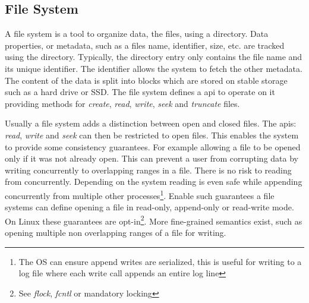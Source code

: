 \subsection{File System}
A file system is a tool to organize data, the files, using a directory. Data properties, or metadata, such as a files name, identifier, size, etc. are tracked using the directory. Typically, the directory entry only contains the file name and its unique identifier. The identifier allows the system to fetch the other metadata. The content of the data is split into blocks which are stored on stable storage such as a hard drive or SSD. The file system defines a \ac{api} to operate on it providing methods for \textit{create}, \textit{read}, \textit{write}, \textit{seek} and \textit{truncate} files. 

Usually a file system adds a distinction between open and closed files. The \acp{api}: \textit{read}, \textit{write} and \textit{seek} can then be restricted to open files. This enables the system to provide some consistency guarantees. For example allowing a file to be opened only if it was not already open. This can prevent a user from corrupting data by writing concurrently to overlapping ranges in a file. There is no risk to reading from concurrently. Depending on the system reading is even safe while appending concurrently from multiple other processes\footnote{The OS can ensure append writes are serialized, this is useful for writing to a log file where each write call appends an entire log line}. Enable such guarantees a file systems can define opening a file in read-only, append-only or read-write mode. On Linux these guarantees are opt-in\footnote{See \textsl{flock}, \textsl{fcntl} or mandatory locking}. More fine-grained semantics exist, such as opening multiple non overlapping ranges of a file for writing. 

